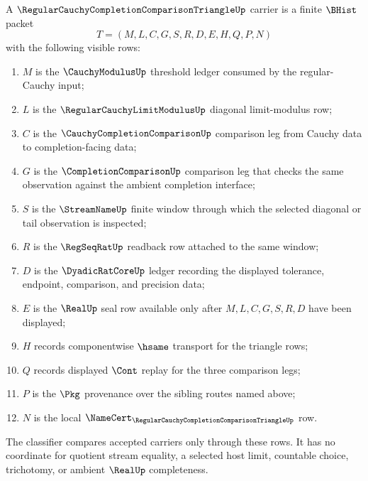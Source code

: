 \begin{definition}
\label{def:regular-cauchy-completion-comparison-triangle-carrier}
A $\RegularCauchyCompletionComparisonTriangleUp$ carrier is a finite $\BHist$ packet
$$
T=(M,L,C,G,S,R,D,E,H,Q,P,N)
$$
with the following visible rows:
\begin{enumerate}
\item $M$ is the $\CauchyModulusUp$ threshold ledger consumed by the regular-Cauchy input;
\item $L$ is the $\RegularCauchyLimitModulusUp$ diagonal limit-modulus row;
\item $C$ is the $\CauchyCompletionComparisonUp$ comparison leg from Cauchy data to completion-facing data;
\item $G$ is the $\CompletionComparisonUp$ comparison leg that checks the same observation against the ambient completion interface;
\item $S$ is the $\StreamNameUp$ finite window through which the selected diagonal or tail observation is inspected;
\item $R$ is the $\RegSeqRatUp$ readback row attached to the same window;
\item $D$ is the $\DyadicRatCoreUp$ ledger recording the displayed tolerance, endpoint, comparison, and precision data;
\item $E$ is the $\RealUp$ seal row available only after $M,L,C,G,S,R,D$ have been displayed;
\item $H$ records componentwise $\hsame$ transport for the triangle rows;
\item $Q$ records displayed $\Cont$ replay for the three comparison legs;
\item $P$ is the $\Pkg$ provenance over the sibling routes named above;
\item $N$ is the local $\NameCert_{\RegularCauchyCompletionComparisonTriangleUp}$ row.
\end{enumerate}
The classifier compares accepted carriers only through these rows. It has no coordinate for quotient stream equality, a selected host limit, countable choice, trichotomy, or ambient $\RealUp$ completeness.
\end{definition}

